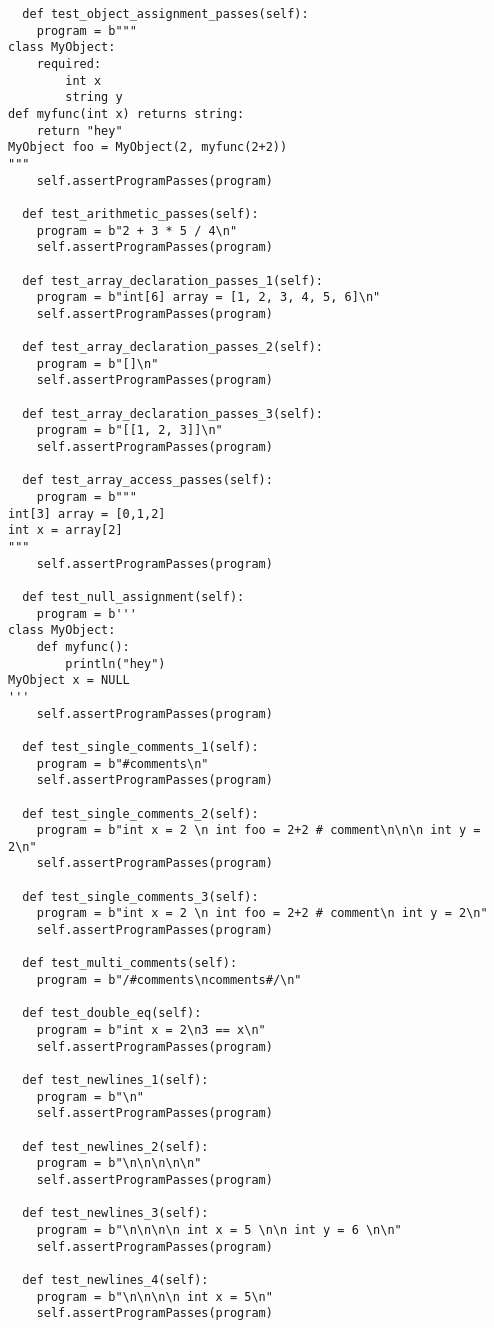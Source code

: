 \documentclass{article}
\begin{document}
\begin{verbatim}
  def test_object_assignment_passes(self):
    program = b"""
class MyObject:
	required:
		int x
		string y
def myfunc(int x) returns string:
	return "hey"
MyObject foo = MyObject(2, myfunc(2+2))
"""
    self.assertProgramPasses(program)

  def test_arithmetic_passes(self):
    program = b"2 + 3 * 5 / 4\n"
    self.assertProgramPasses(program)

  def test_array_declaration_passes_1(self):
    program = b"int[6] array = [1, 2, 3, 4, 5, 6]\n"
    self.assertProgramPasses(program)

  def test_array_declaration_passes_2(self):
    program = b"[]\n"
    self.assertProgramPasses(program)

  def test_array_declaration_passes_3(self):
    program = b"[[1, 2, 3]]\n"
    self.assertProgramPasses(program)

  def test_array_access_passes(self):
    program = b"""
int[3] array = [0,1,2]
int x = array[2]
"""
    self.assertProgramPasses(program)

  def test_null_assignment(self):
    program = b'''
class MyObject:
	def myfunc():
		println("hey")
MyObject x = NULL
'''
    self.assertProgramPasses(program)

  def test_single_comments_1(self):
    program = b"#comments\n"
    self.assertProgramPasses(program)

  def test_single_comments_2(self):
    program = b"int x = 2 \n int foo = 2+2 # comment\n\n\n int y = 2\n"
    self.assertProgramPasses(program)

  def test_single_comments_3(self):
    program = b"int x = 2 \n int foo = 2+2 # comment\n int y = 2\n"
    self.assertProgramPasses(program)

  def test_multi_comments(self):
    program = b"/#comments\ncomments#/\n"
    
  def test_double_eq(self):
    program = b"int x = 2\n3 == x\n"
    self.assertProgramPasses(program)

  def test_newlines_1(self):
    program = b"\n"
    self.assertProgramPasses(program)

  def test_newlines_2(self):
    program = b"\n\n\n\n\n"
    self.assertProgramPasses(program)

  def test_newlines_3(self):
    program = b"\n\n\n\n int x = 5 \n\n int y = 6 \n\n"
    self.assertProgramPasses(program)

  def test_newlines_4(self):
    program = b"\n\n\n\n int x = 5\n"
    self.assertProgramPasses(program)


\end{verbatim}
\end{document}

